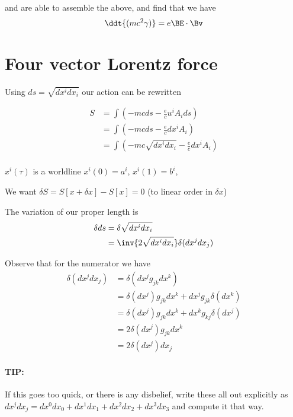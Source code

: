 and are able to assemble the above, and find that we have
\begin{equation}\label{eqn:relativisticElectrodynamicsL10:290}
\ddt{(m c^2 \gamma)} = e \BE \cdot \Bv 
\end{equation}

\section{Four vector Lorentz force}

Using $ds = \sqrt{ dx^i dx_i } $ our action can be rewritten

\begin{align*}
S 
&= \int \left( -m c ds - \frac{e}{c} u^i A_i ds \right) \\
&= \int \left( -m c ds - \frac{e}{c} dx^i A_i \right) \\
&= \int \left( -m c \sqrt{ dx^i dx_i} - \frac{e}{c} dx^i A_i \right) \\
\end{align*}

$x^i(\tau)$ is a worldline $x^i(0) = a^i$, $x^i(1) = b^i$, 

We want $\delta S = S[ x + \delta x ] - S[ x ] = 0$ (to linear order in $\delta x$)

The variation of our proper length is
\begin{align*}
\delta ds 
&=
\delta \sqrt{ dx^i dx_i } \\
&= \inv{ 2 \sqrt{ dx^i dx_i }} \delta (dx^j dx_j)
\end{align*}

Observe that for the numerator we have
\begin{align*}
\delta (dx^j dx_j) 
&= \delta ( dx^j g_{jk} dx^k ) \\
&= \delta ( dx^j ) g_{jk} dx^k + dx^j g_{jk} \delta ( dx^k ) \\
&= \delta ( dx^j ) g_{jk} dx^k + dx^k g_{kj} \delta ( dx^j ) \\
&= 2 \delta ( dx^j ) g_{jk} dx^k \\
&= 2 \delta ( dx^j ) dx_j 
\end{align*}

\paragraph{TIP:} If this goes too quick, or there is any disbelief, write these all out explicitly as $dx^j dx_j = dx^0 dx_0 + dx^1 dx_1 + dx^2 dx_2 + dx^3 dx_3$ and compute it that way.

